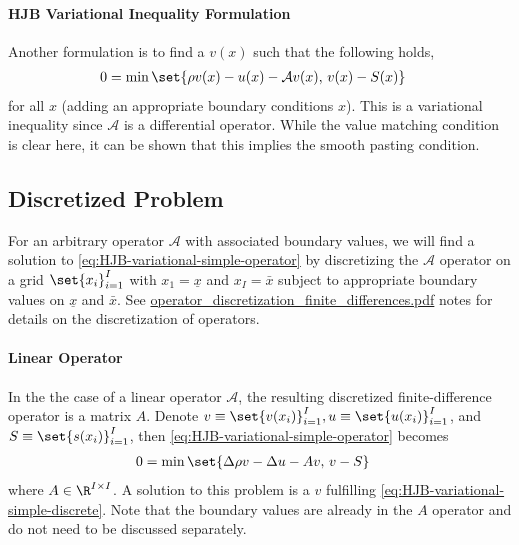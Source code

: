 \documentclass[11pt]{etk-article}
\begin{document}
\paragraph{HJB Variational Inequality Formulation}
Another formulation is to find a $v(x)$ such that the following holds,
\begin{align}
	0 &= \min\set{\rho v(x) - u(x) - \mathcal{A} v(x),\, v(x) - S(x) }\label{eq:HJB-variational-simple-operator}
\end{align}	
for all $x$ (adding an appropriate boundary conditions $x$).  This is a variational inequality since $\mathcal{A}$ is a differential operator.  While the value matching condition is clear here, it can be shown that this implies the smooth pasting condition.


\subsection{Discretized Problem}
For an arbitrary operator $\mathcal{A}$ with associated boundary values, we will find a solution to \cref{eq:HJB-variational-simple-operator} by discretizing the $\mathcal{A}$ operator on a grid $\set{x_i}_{i=1}^I$ with $x_1 = \underline{x}$ and $x_I = \bar{x}$ subject to appropriate boundary values on $\underline{x}$ and $\bar{x}$.  See \url{operator_discretization_finite_differences.pdf} notes for details on the discretization of operators.
\paragraph{Linear Operator}
In the the case of a linear operator $\mathcal{A}$, the resulting discretized finite-difference operator is a matrix $A$.  Denote $v \equiv \set{v(x_i)}_{i=1}^I, u \equiv \set{u(x_i)}_{i=1}^I$, and $S \equiv \set{s(x_i)}_{i=1}^I$, then \cref{eq:HJB-variational-simple-operator} becomes
\begin{align}
	0 &= \min\set{\Delta \rho v - \Delta u - A v,\, v - S }\label{eq:HJB-variational-simple-discrete}
\end{align}
where $A\in\R^{I\times I}$.  A solution to this problem is a $v$ fulfilling \cref{eq:HJB-variational-simple-discrete}.  Note that the boundary values are already in the $A$ operator and do not need to be discussed separately.
\end{document}
